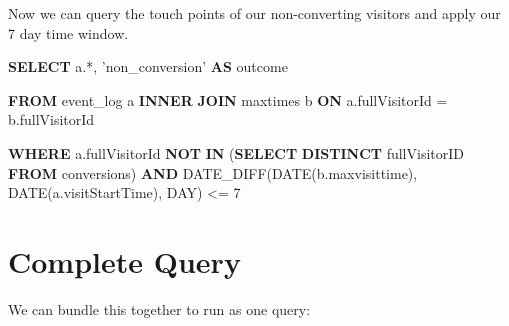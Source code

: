 \documentclass[]{book}
\newenvironment{Shaded}{\begin{snugshade}}{\end{snugshade}}
\newcommand{\DataTypeTok}[1]{\textcolor[rgb]{0.13,0.29,0.53}{#1}}
\newcommand{\DecValTok}[1]{\textcolor[rgb]{0.00,0.00,0.81}{#1}}
\newcommand{\KeywordTok}[1]{\textcolor[rgb]{0.13,0.29,0.53}{\textbf{#1}}}
\newcommand{\NormalTok}[1]{#1}
\newcommand{\StringTok}[1]{\textcolor[rgb]{0.31,0.60,0.02}{#1}}
\begin{document}
Now we can query the touch points of our non-converting visitors and apply
our 7 day time window.

\begin{Shaded}
\begin{Highlighting}[]
\KeywordTok{SELECT}\NormalTok{ a.*,}
         \StringTok{'non_conversion'} \KeywordTok{AS}\NormalTok{ outcome}

  \KeywordTok{FROM}\NormalTok{ event_log a}
    \KeywordTok{INNER} \KeywordTok{JOIN}\NormalTok{ maxtimes b }\KeywordTok{ON}\NormalTok{ a.fullVisitorId = b.fullVisitorId }

  \KeywordTok{WHERE}\NormalTok{ a.fullVisitorId }\KeywordTok{NOT} \KeywordTok{IN}\NormalTok{ (}\KeywordTok{SELECT} \KeywordTok{DISTINCT}\NormalTok{ fullVisitorID }\KeywordTok{FROM}\NormalTok{ conversions)}
   \KeywordTok{AND}\NormalTok{  DATE_DIFF(}\DataTypeTok{DATE}\NormalTok{(b.maxvisittime), }\DataTypeTok{DATE}\NormalTok{(a.visitStartTime), }\DataTypeTok{DAY}\NormalTok{) <= }\DecValTok{7}
\end{Highlighting}
\end{Shaded}

\hypertarget{complete-query}{%
\section{Complete Query}\label{complete-query}}

We can bundle this together to run as one query:
\end{document}
